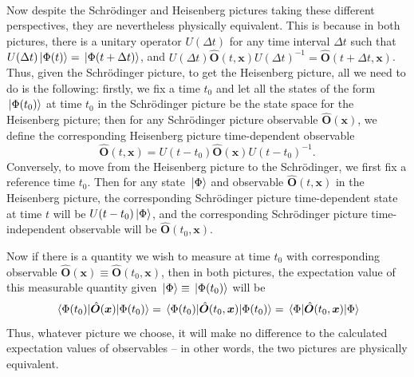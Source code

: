 \strut \\[\baselineskip] 
Now despite the Schr\"{o}dinger and Heisenberg pictures taking these different perspectives, they are nevertheless physically equivalent. This is because in both pictures, there is a unitary operator $U(\Delta t)$ for any time interval $\Delta t$ such that $U(\Delta t)\ket*{\Phi(t)}=\ket*{\Phi(t+\Delta t)}$, and $U(\Delta t)\hat{\bm{O}}(t, \bm{x})U(\Delta t)^{-1}=\hat{\bm{O}}(t+\Delta t, \bm{x})$. Thus, given the Schr\"{o}dinger picture, to get the Heisenberg picture, all we need to do is the following: firstly, we fix a time $t_0$ and let all the states of the form $\ket*{\Phi(t_0)}$ at time $t_0$ in the Schr\"{o}dinger picture be the state space for the Heisenberg picture; then for any Schr\"{o}dinger picture observable $\hat{\bm{O}}(\bm{x})$, we define the corresponding Heisenberg picture time-dependent observable 
$$\hat{\bm{O}}(t, \bm{x})=U(t-t_0)\hat{\bm{O}}(\bm{x})U(t-t_0)^{-1}.$$ 
Conversely, to move from the Heisenberg picture to the Schr\"{o}dinger, we first fix a reference time $t_0$. Then for any state $\ket*{\Phi}$ and observable $\hat{\bm{O}}(t, \bm{x})$ in the Heisenberg picture, the corresponding Schr\"{o}dinger picture time-dependent state at time $t$ will be $U(t-t_0)\ket*{\Phi}$, and the corresponding Schr\"{o}dinger picture time-independent observable will be $\hat{\bm{O}}(t_0, \bm{x})$.

Now if there is a quantity we wish to measure at time $t_0$ with corresponding observable $\hat{\bm{O}}(\bm{x})\equiv\hat{\bm{O}}(t_0, \bm{x})$, then in both pictures, the expectation value of this measurable quantity given $\ket*{\Phi}\equiv\ket*{\Phi(t_0)}$ will be 
\begin{equation}\label{heisshrodeq}
  \ev*{\hat{\bm{O}}(\bm{x})}{\Phi(t_0)}=\ev*{\hat{\bm{O}}(t_0,\bm{x})}{\Phi(t_0)}=\ev*{\hat{\bm{O}}(t_0, \bm{x})}{\Phi}
\end{equation}
Thus, whatever picture we choose, it will make no difference to the calculated expectation values of observables -- in other words, the two pictures are physically equivalent.


